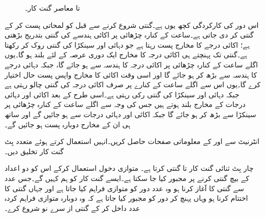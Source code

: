 \begin{figure}
\caption{ تا  معاصر گنت کار۔}
\label{شکل_گنت_کار_معاصر_ہزار}
\end{figure}

اس دور کی کارکردگی کچھ یوں ہے۔گنتی شروع کرنے سے قبل  کو لمحاتی پست کر کے گنتی  کر دی جاتی ہے۔ساعت کے کنارہ چڑھائی پر اکائی ہندسے کی گنتی بتدریج بڑھتی ہے؛ اکائی درجے کا مخارج  پست رہتا ہے جو دہائی اور سینکڑا کی گنتی روک کر رکھتا ہے۔گنتی  تک پہنچتے ہی اکائی درجہ کا مخارج  ایک دوری عرصہ کے لئے بلند ہو گا۔یوں اگلے ساعت کے کنارہ چڑھائی پر اکائی درجہ کا ہندسہ سے  ہو جائے گا، جبکہ دہائی درجے کا ہندسہ  سے بڑھ کر  ہو جائے گا اور اسی وقت اکائی کا مخارج  واپس پست حال اختیار کرے گا۔یوں اس سے اگلے ساعت کے کنارے پر صرف اکائی درجہ کی گنتی چالو رہتی ہے جبکہ دہائی اور سینکڑا کی گنتی رکی رہتی ہے۔اسی طرح  کے بعد اکائی اور دہائی درجات کے مخارج  بلند ہوتے ہیں جس کی وجہ سے اگلے ساعت کے کنارہ چڑھائی پر سینکڑا  سے بڑھ کر  ہو جائے گا جبکہ اکائی اور دہائی درجات  سے  ہو جائیں گے اور ساتھ ہی ان کے مخارج  دوبارہ پست ہو جائیں گے۔

انٹرنیٹ سے  اور  کے معلوماتی صفحات حاصل کریں۔انہیں استعمال کرتے ہوئے متعدد بِٹ گنت کار تخلیق دیں۔


چار بِٹ ثنائی گنت کار  تا  گنتی کرتا ہے۔ متوازی دخول استعمال کرکے اس کو دو اعداد کے بیچ گنتی کرنے پر مجبور کیا جا سکتا ہے۔ایسے گنت کار کو ہم کہیں گے۔جس عدد سے گنتی کا آغاز کرنا ہو وہ عدد دور کو متوازی فراہم کیا جاتا ہے اور جہاں گنتی کا اختتام کرنا ہو وہاں پہنچ کر دور کو مجبور کیا جاتا ہے کہ وہ دوبارہ متوازی فراہم کردہ عدد داخل کر کے گنتی از سرے نو شروع کرے۔

